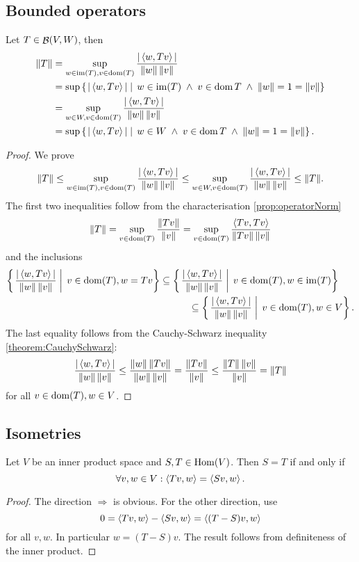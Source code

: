 \subsection{Bounded operators}
\begin{lemma} \label{lemma:operatorNormInnerProduct}
Let $T\in\mathop{\mathcal{B}}(V,W)$, then
\begin{align*}
\lVert T\rVert &= \sup_{w\in \operatorname{im}(T),v \in \operatorname{dom}(T)} \frac{|\left\langle w,Tv \right\rangle|}{\lVert w\rVert\,\lVert v\rVert} \\
&= \sup\left\{\left. |\left\langle w,Tv \right\rangle| \;\right|\; w\in \operatorname{im}(T)\;\land\; v\in\operatorname{dom}{T}\;\land\; \lVert w\rVert = 1 = \lVert v\rVert \right\} \\
&= \sup_{w\in W,v \in \operatorname{dom}(T)} \frac{|\left\langle w,Tv \right\rangle|}{\lVert w\rVert\,\lVert v\rVert} \\
&= \sup\left\{\left. |\left\langle w,Tv \right\rangle| \;\right|\; w\in W\;\land\; v\in\operatorname{dom}{T}\;\land\; \lVert w\rVert = 1 = \lVert v\rVert \right\}.
\end{align*}
\end{lemma}
\begin{proof}
We prove
\[ \lVert T\rVert \leq \sup_{w\in \operatorname{im}(T),v \in \operatorname{dom}(T)} \frac{|\left\langle w,Tv \right\rangle|}{\lVert w\rVert\,\lVert v\rVert} \leq \sup_{w\in W,v \in \operatorname{dom}(T)} \frac{|\left\langle w,Tv \right\rangle|}{\lVert w\rVert\,\lVert v\rVert} \leq \lVert T\rVert. \]
The first two inequalities follow from the characterisation \ref{prop:operatorNorm}
\[ \lVert T\rVert = \sup_{v \in \operatorname{dom}(T)} \frac{\lVert Tv\rVert}{\lVert v\rVert} = \sup_{v \in \operatorname{dom}(T)} \frac{\left\langle Tv,Tv \right\rangle}{\lVert Tv\rVert\,\lVert v\rVert} \]
and the inclusions
\begin{align*}
\left\{\left. \frac{|\left\langle w,Tv \right\rangle|}{\lVert w\rVert\,\lVert v\rVert} \;\right|\; v\in\operatorname{dom}(T), w = Tv \right\} &\subseteq \left\{\left. \frac{|\left\langle w,Tv \right\rangle|}{\lVert w\rVert\,\lVert v\rVert} \;\right|\; v\in\operatorname{dom}(T), w\in\operatorname{im}(T) \right\}\\
&\qquad\quad\subseteq \left\{\left. \frac{|\left\langle w,Tv \right\rangle|}{\lVert w\rVert\,\lVert v\rVert} \;\right|\; v\in\operatorname{dom}(T), w\in V \right\}.
\end{align*}
The last equality follows from the Cauchy-Schwarz inequality \ref{theorem:CauchySchwarz}:
\[ \frac{|\left\langle w,Tv \right\rangle|}{\lVert w\rVert\,\lVert v\rVert} \leq \frac{\lVert w\rVert\,\lVert Tv\rVert}{\lVert w\rVert\,\lVert v\rVert} = \frac{\lVert Tv\rVert}{\lVert v\rVert} \leq \frac{\lVert T\rVert\,\lVert v\rVert}{\lVert v\rVert} = \lVert T\rVert \]
for all $v\in\operatorname{dom}(T), w\in V$. 
\end{proof}

\subsection{Isometries}
\begin{lemma} \label{lemma:equalityOfMapsInnerProductSpaces}
Let $V$ be an inner product space and $S,T\in\operatorname{Hom}(V)$. Then $S=T$ \textup{if and only if}
\[ \forall v,w\in V: \left\langle Tv,w \right\rangle = \left\langle Sv,w \right\rangle. \]
\end{lemma}
\begin{proof}
The direction $\boxed{\Rightarrow}$ is obvious. For the other direction, use
\[ 0 = \left\langle Tv,w \right\rangle - \left\langle Sv,w \right\rangle = \left\langle (T-S)v,w \right\rangle \]
for all $v,w$. In particular $w=(T-S)v$. The result follows from definiteness of the inner product.
\end{proof}

